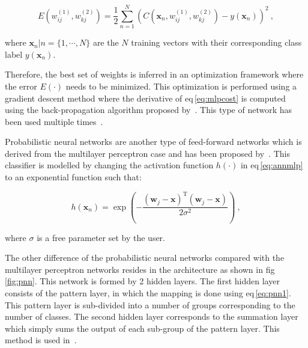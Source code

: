 \begin{equation}
	E(w_{ij}^{(1)},w_{kj}^{(2)}) = \frac{1}{2} \sum_{n=1}^{N} \left( C(\mathbf{x}_n,w_{ij}^{(1)},w_{kj}^{(2)}) - y(\mathbf{x}_n) \right) ^{2} \ ,
	\label{eq:mlpcost}
\end{equation}

\noindent where $\mathbf{x}_n|n=\{1,\cdots,N\}$ are the $N$ training vectors with their corresponding class label $y(\mathbf{x}_n)$.

Therefore, the best set of weights is inferred in an optimization framework where the error $E(\cdot)$ needs to be minimized.
This optimization is performed using a gradient descent method where the derivative of \acs{eq}\,\eqref{eq:mlpcost} is computed using the back-propagation algorithm proposed by~\cite{Rumelhart1988}.
This type of network has been used multiple times~\cite{Matulewicz2013,Parfait2012,trigui2017automatic,trigui2016classification,rampun2016computer}.



Probabilistic neural networks are another type of feed-forward networks which is derived from the multilayer perceptron case and has been proposed by~\cite{Specht1988}.
This classifier is modelled by changing the activation function $h(\cdot)$ in \acs{eq}\,\eqref{eq:annmlp} to an exponential function such that:

\begin{equation}
	h(\mathbf{x}_n) = \exp \left( - \frac{ (\mathbf{w}_j - \mathbf{x})^{\text{T}}(\mathbf{w}_j - \mathbf{x}) }{2\sigma^2} \right) \ ,
	\label{eq:pnn1}
\end{equation}

\noindent where $\sigma$ is a free parameter set by the user.

The other difference of the probabilistic neural networks compared with the multilayer perceptron networks resides in the architecture as shown in \acs{fig}\,\ref{fig:pnn}.
This network is formed by 2 hidden layers.
The first hidden layer consists of the pattern layer, in which the mapping is done using \acs{eq}\,\eqref{eq:pnn1}.
This pattern layer is sub-divided into a number of groups corresponding to the number of classes.
The second hidden layer corresponds to the summation layer which simply sums the output of each sub-group of the pattern layer.
This method is used in~\cite{Ampeliotis2007,Ampeliotis2008,Viswanath2011}.

